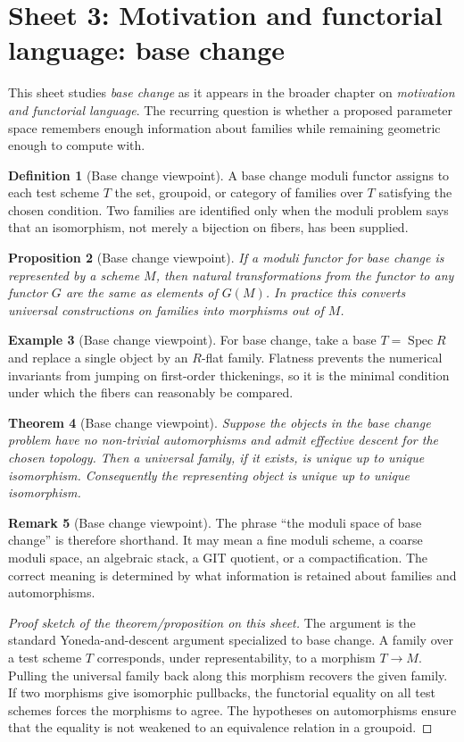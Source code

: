 \documentclass[11pt]{amsart}
\newtheorem{theorem}{Theorem}[section]
\newtheorem{proposition}[theorem]{Proposition}
\theoremstyle{definition}
\newtheorem{definition}[theorem]{Definition}
\newtheorem{example}[theorem]{Example}
\newtheorem{remark}[theorem]{Remark}
\newcommand{\Spec}{\operatorname{Spec}}
\begin{document}
\section{Sheet 3: Motivation and functorial language: base change}
This sheet studies \emph{base change} as it appears in the broader chapter on \emph{motivation and functorial language}.  The recurring question is whether a proposed parameter space remembers enough information about families while remaining geometric enough to compute with.
\begin{definition}[Base change viewpoint]
A base change moduli functor assigns to each test scheme $T$ the set, groupoid, or category of families over $T$ satisfying the chosen condition.  Two families are identified only when the moduli problem says that an isomorphism, not merely a bijection on fibers, has been supplied.
\end{definition}
\begin{proposition}[Base change viewpoint]
If a moduli functor for base change is represented by a scheme $M$, then natural transformations from the functor to any functor $G$ are the same as elements of $G(M)$.  In practice this converts universal constructions on families into morphisms out of $M$.
\end{proposition}
\begin{example}[Base change viewpoint]
For base change, take a base $T=\Spec R$ and replace a single object by an $R$-flat family.  Flatness prevents the numerical invariants from jumping on first-order thickenings, so it is the minimal condition under which the fibers can reasonably be compared.
\end{example}
\begin{theorem}[Base change viewpoint]
Suppose the objects in the base change problem have no non-trivial automorphisms and admit effective descent for the chosen topology.  Then a universal family, if it exists, is unique up to unique isomorphism.  Consequently the representing object is unique up to unique isomorphism.
\end{theorem}
\begin{remark}[Base change viewpoint]
The phrase ``the moduli space of base change'' is therefore shorthand.  It may mean a fine moduli scheme, a coarse moduli space, an algebraic stack, a GIT quotient, or a compactification.  The correct meaning is determined by what information is retained about families and automorphisms.
\end{remark}
\begin{proof}[Proof sketch of the theorem/proposition on this sheet]
The argument is the standard Yoneda-and-descent argument specialized to base change.  A family over a test scheme $T$ corresponds, under representability, to a morphism $T\to M$.  Pulling the universal family back along this morphism recovers the given family.  If two morphisms give isomorphic pullbacks, the functorial equality on all test schemes forces the morphisms to agree.  The hypotheses on automorphisms ensure that the equality is not weakened to an equivalence relation in a groupoid.
\end{proof}
\end{document}
